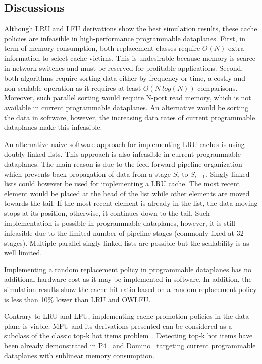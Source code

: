 \subsection{Discussions}

Although LRU and LFU derivations show the best simulation results, these cache policies are infeasible in high-performance programmable dataplanes.
First, in term of memory consumption, both replacement classes require $O(N)$ extra information to select cache victims.
This is undesirable because memory is scarce in network switches and must be reserved for profitable applications.
Second, both algorithms require sorting data either by frequency or time, a costly and non-scalable operation as it requires at least $O(N~log(N))$ comparisons.
Moreover, such parallel sorting would require N-port read memory, which is not available in current programmable dataplanes.
An alternative would be sorting the data in software, however, the increasing data rates of current programmable dataplanes make this infeasible.  

An alternative naive software approach for implementing LRU caches is using doubly linked lists.
This approach is also infeasible in current programmable dataplanes.
The main reason is due to the feed-forward pipeline organization which prevents back propagation of data from a stage $S_{i}$ to $S_{i-1}$.
Singly linked lists could however be used for implementing a LRU cache.
The most recent element would be placed at the head of the list while other elements are moved towards the tail.
If the most recent element is already in the list, the data moving stops at its position, otherwise, it continues down to the tail.
Such implementation is possible in programmable dataplanes, however, it is still infeasible due to the limited number of pipeline stages (commonly fixed at 32 stages).
Multiple parallel singly linked lists are possible but the scalability is as well limited.

Implementing a random replacement policy in programmable dataplanes has no additional hardware cost as it may be implemented in software.
In addition, the simulation results show the cache hit ratio based on a random replacement policy is less than 10\% lower than LRU and OWLFU.

Contrary to LRU and LFU, implementing cache promotion policies in the data plane is viable.
MFU and its derivations presented can be considered as a subclass of the classic top-k hot items problem~\cite{Metwally:2005}.
Detecting top-k hot items have been already demonstrated in P4~\cite{Sivaraman:17} and Domino~\cite{SivaramanDomino:2016} targeting current programmable dataplanes with sublinear memory consumption.


